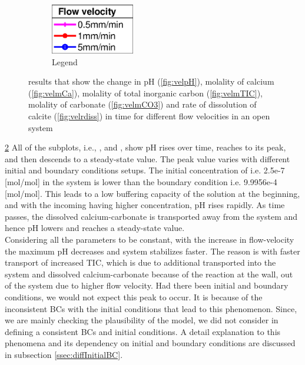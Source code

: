 \begin{figure}[!h]
\begin{subfigure}{.5\linewidth}
        \centering
        \includegraphics[width=0.40\textwidth]{PICTURES/with_vel_legend.eps}
        \caption{Legend}
        \label{fig:vellegend}
    \end{subfigure}%
    \hfill
     \caption{\DuMuX results that show the change in pH (\cref{fig:velpH}), molality of calcium (\cref{fig:velmCa}), 
     molality of total inorganic carbon (\cref{fig:velmTIC}), molality of carbonate (\cref{fig:velmCO3}) and rate of 
     dissolution of calcite (\cref{fig:velrdiss}) in time for different flow velocities in an open system}
     \label{fig:comparisionDiffFlowVelocity}
\end{figure}

\cref{fig:comparisionDiffFlowVelocity} All of the subplots, i.e., ,  and , 
show pH rises over time, reaches to its peak, and then descends to a steady-state value. The peak value 
varies with different initial and boundary conditions setups. 
The initial concentration of  i.e. 2.5e-7 [mol/mol] in the system is lower than the 
boundary condition i.e. 9.9956e-4 [mol/mol]. This leads to a low buffering capacity of the solution at the 
beginning, and with the incoming  having higher concentration, pH rises rapidly. As time passes, 
the dissolved calcium-carbonate is transported away from the system and hence pH lowers and reaches a steady-state value.\\
Considering all the parameters to be constant, with the increase in flow-velocity the maximum pH decreases and system stabilizes faster. 
The reason is with faster transport of increased TIC, which is due to additional  transported into the system and 
dissolved calcium-carbonate because of the reaction at the wall, out of the system due to higher flow velocity. 
Had there been initial and boundary conditions, we would not expect this peak to occur. It is because of the inconsistent 
BCs with the initial conditions that lead to this phenomenon. Since, we are mainly checking the plausibility of the model, 
we did not consider in defining a consistent BCs and initial conditions. A detail explanation to this phenomena and its dependency 
on initial and boundary conditions are discussed in subsection \ref{ssec:diffInitialBC}.


